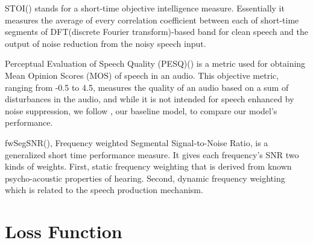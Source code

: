 \documentclass{article}
\begin{document}
\vspace{1cm}

STOI(\cite{STOI}) stands for a short-time objective intelligence measure. Essentially it measures the average of every correlation coefficient between each of short-time segments of DFT(discrete Fourier transform)-based band for clean speech and the output of noise reduction from the noisy speech input. 

Perceptual Evaluation of Speech Quality (PESQ)(\cite{PESQ}) is a metric used for obtaining Mean Opinion Scores (MOS) of speech in an audio. This objective metric, ranging from -0.5 to 4.5, measures the quality of an audio based on a sum of disturbances in the audio, and while it is not intended for speech enhanced by noise suppression, we follow \cite{microsoftTeams}, our baseline model, to compare our model’s performance.


fwSegSNR(\cite{evalMetrics}), Frequency weighted Segmental Signal-to-Noise Ratio, is a generalized short time performance measure. It gives each frequency’s SNR two kinds of weights. First, static frequency weighting that is derived from known psycho-acoustic properties of hearing. Second, dynamic frequency weighting which is related to the speech production mechanism.

\section{Loss Function}
\end{document}

